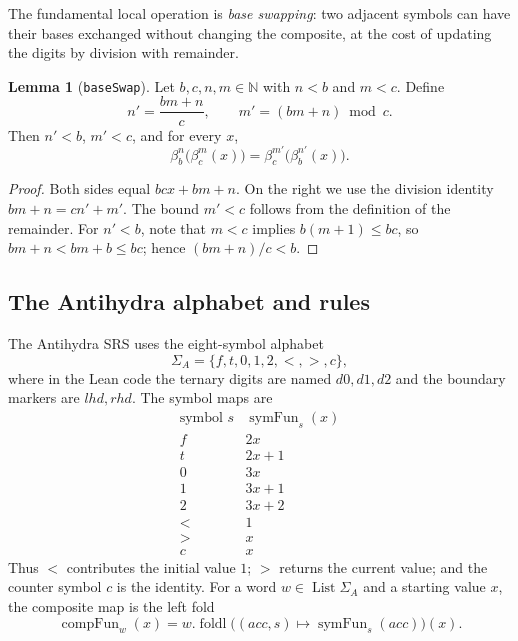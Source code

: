 \documentclass[11pt,a4paper]{article}
\theoremstyle{definition}
\newtheorem{lemma}[definition]{Lemma}
\newcommand{\lt}{<}
\newcommand{\gt}{>}
\newcommand{\Nat}{\mathbb{N}}
\newcommand{\List}{\operatorname{List}}
\newcommand{\foldl}{\operatorname{foldl}}
\newcommand{\symfun}{\operatorname{symFun}}
\newcommand{\compFun}{\operatorname{compFun}}
\begin{document}
The fundamental local operation is \emph{base swapping}: two adjacent
symbols can have their bases exchanged without changing the composite,
at the cost of updating the digits by division with remainder.

\begin{lemma}[\texttt{baseSwap}]
  \label{lem:base-swap}
  Let $b,c,n,m\in\Nat$ with $n<b$ and $m<c$.  Define
  \[
    n'=\frac{bm+n}{c},
    \qquad
    m'=(bm+n)\bmod c.
  \]
  Then $n'<b$, $m'<c$, and for every $x$,
  \[
    \beta_b^n\bigl(\beta_c^m(x)\bigr)
    =
    \beta_c^{m'}\bigl(\beta_b^{n'}(x)\bigr).
  \]
\end{lemma}
\begin{proof}
  Both sides equal $bcx+bm+n$.  On the right we use the division
  identity $bm+n=cn'+m'$.  The bound $m'<c$ follows from the definition
  of the remainder.  For $n'<b$, note that $m<c$ implies
  $b(m+1)\le bc$, so $bm+n<bm+b\le bc$; hence $(bm+n)/c<b$.
\end{proof}

\subsection{The Antihydra alphabet and rules}
\label{subsec:lean-alphabet}

The Antihydra SRS uses the eight-symbol alphabet
\[
  \Sigma_{A}=\{f,t,0,1,2,\lt,\gt,c\},
\]
where in the Lean code the ternary digits are named $d0,d1,d2$ and the
boundary markers are $lhd,rhd$.  The symbol maps are
\begin{equation}
  \label{eq:symfun}
  \begin{array}{c|c}
    \text{symbol }s & \symfun_s(x) \\ \hline
    f & 2x \\
    t & 2x+1 \\
    0 & 3x \\
    1 & 3x+1 \\
    2 & 3x+2 \\
    \lt & 1 \\
    \gt & x \\
    c & x
  \end{array}
\end{equation}
Thus $\lt$ contributes the initial value $1$; $\gt$ returns the current
value; and the counter symbol $c$ is the identity.  For a word
$w\in\List{\Sigma_A}$ and a starting value $x$, the composite map is the
left fold
\[
  \compFun_w(x)=w.\foldl\bigl((acc,s)\mapsto\symfun_s(acc)\bigr)(x).
\]
\end{document}
